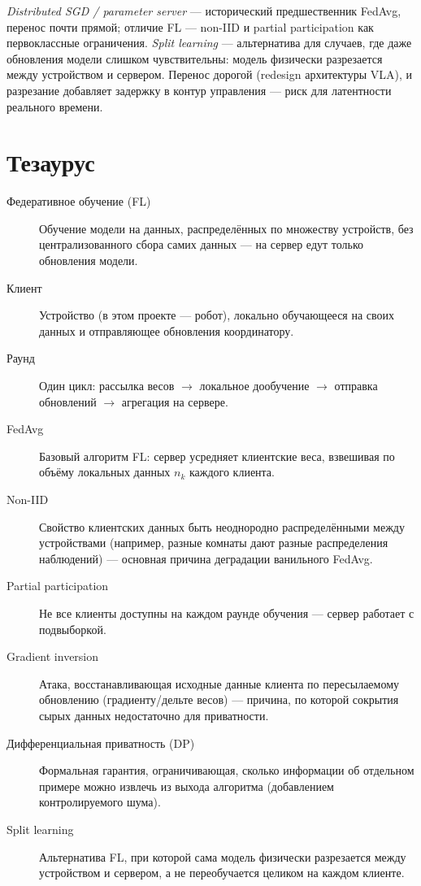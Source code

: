 \documentclass[11pt]{article}
\begin{document}
\emph{Distributed SGD / parameter server} — исторический предшественник FedAvg,
перенос почти прямой; отличие FL — non-IID и partial participation как
первоклассные ограничения. \emph{Split learning} — альтернатива для случаев, где даже
обновления модели слишком чувствительны: модель физически разрезается между
устройством и сервером. Перенос дорогой (redesign архитектуры VLA), и разрезание
добавляет задержку в контур управления — риск для латентности реального времени.

\section{Тезаурус}

\begin{description}
  \item[Федеративное обучение (FL)] Обучение модели на данных, распределённых по
    множеству устройств, без централизованного сбора самих данных — на сервер едут
    только обновления модели.
  \item[Клиент] Устройство (в этом проекте — робот), локально обучающееся на своих
    данных и отправляющее обновления координатору.
  \item[Раунд] Один цикл: рассылка весов $\to$ локальное дообучение $\to$ отправка
    обновлений $\to$ агрегация на сервере.
  \item[FedAvg] Базовый алгоритм FL: сервер усредняет клиентские веса, взвешивая по
    объёму локальных данных $n_k$ каждого клиента.
  \item[Non-IID] Свойство клиентских данных быть неоднородно распределёнными между
    устройствами (например, разные комнаты дают разные распределения наблюдений) —
    основная причина деградации ванильного FedAvg.
  \item[Partial participation] Не все клиенты доступны на каждом раунде обучения —
    сервер работает с подвыборкой.
  \item[Gradient inversion] Атака, восстанавливающая исходные данные клиента по
    пересылаемому обновлению (градиенту/дельте весов) — причина, по которой сокрытия
    сырых данных недостаточно для приватности.
  \item[Дифференциальная приватность (DP)] Формальная гарантия, ограничивающая, сколько
    информации об отдельном примере можно извлечь из выхода алгоритма (добавлением
    контролируемого шума).
  \item[Split learning] Альтернатива FL, при которой сама модель физически разрезается
    между устройством и сервером, а не переобучается целиком на каждом клиенте.
\end{description}
\end{document}
